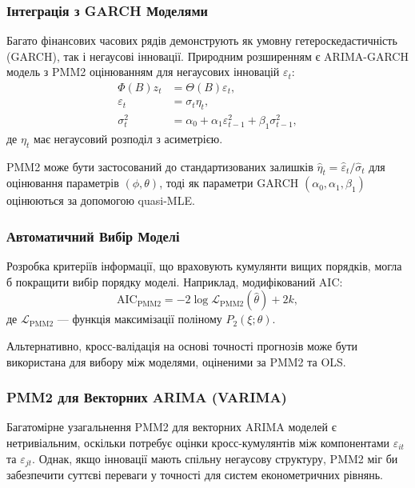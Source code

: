 \documentclass[12pt,a4paper]{article}
\begin{document}
	\subsubsection{Інтеграція з GARCH Моделями}
	
	Багато фінансових часових рядів демонструють як умовну гетероскедастичність (GARCH), так і негаусові інновації. Природним розширенням є ARIMA-GARCH модель з PMM2 оцінюванням для негаусових інновацій $\varepsilon_t$:
	\begin{align}
		\Phi(B) z_t &= \Theta(B) \varepsilon_t, \\
		\varepsilon_t &= \sigma_t \eta_t, \\
		\sigma_t^2 &= \alpha_0 + \alpha_1 \varepsilon_{t-1}^2 + \beta_1 \sigma_{t-1}^2,
	\end{align}
	де $\eta_t$ має негаусовий розподіл з асиметрією.
	
	PMM2 може бути застосований до стандартизованих залишків $\hat{\eta}_t = \hat{\varepsilon}_t / \hat{\sigma}_t$ для оцінювання параметрів $(\phi, \theta)$, тоді як параметри GARCH $(\alpha_0, \alpha_1, \beta_1)$ оцінюються за допомогою quasi-MLE.
	
	\subsubsection{Автоматичний Вибір Моделі}
	
	Розробка критеріїв інформації, що враховують кумулянти вищих порядків, могла б покращити вибір порядку моделі. Наприклад, модифікований AIC:
	\begin{equation}
		\text{AIC}_{\text{PMM2}} = -2 \log \mathcal{L}_{\text{PMM2}}(\hat{\theta}) + 2k,
	\end{equation}
	де $\mathcal{L}_{\text{PMM2}}$ --- функція максимізації поліному $P_2(\xi; \theta)$.
	
	Альтернативно, кросс-валідація на основі точності прогнозів може бути використана для вибору між моделями, оціненими за PMM2 та OLS.
	
	\subsubsection{PMM2 для Векторних ARIMA (VARIMA)}
	
	Багатомірне узагальнення PMM2 для векторних ARIMA моделей є нетривіальним, оскільки потребує оцінки кросс-кумулянтів між компонентами $\varepsilon_{it}$ та $\varepsilon_{jt}$. Однак, якщо інновації мають спільну негаусову структуру, PMM2 міг би забезпечити суттєві переваги у точності для систем економетричних рівнянь.
	
\end{document}
